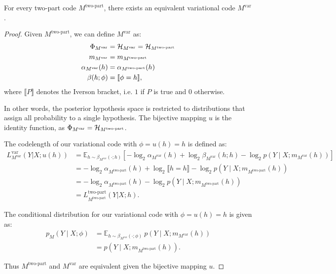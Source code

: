 \begin{lemma}\label{thm:equiv-two-part-var}
For every two-part code $M^{\text{two-part}}$, there exists an equivalent variational code $M^{\text{var}}$.
\end{lemma}
\begin{proof}
Given $M^{\text{two-part}}$, we can define $M^{\text{var}}$ as:
\begin{align}
    \Phi_{M^{\text{var}}} &= {\mathcal{H}}_{M^{\text{var}}} = {\mathcal{H}}_{M^{\text{two-part}}} \\
    m_{M^{\text{var}}} &= m_{M^{\text{two-part}}} \\
    \alpha_{M^{\text{var}}}(h) &= \alpha_{M^{\text{two-part}}}(h) \\
    \beta(h;\phi) &= \llbracket \phi = h \rrbracket,
\end{align}
where $\llbracket P \rrbracket$ denotes the Iverson bracket, i.e. $1$ if $P$ is true and $0$ otherwise.

In other words, the posterior hypothesis space is restricted to distributions that assign all probability to a single hypothesis. The bijective mapping $u$ is the identity function, as $\Phi_{M^{\text{var}}} = {\mathcal{H}}_{M^{\text{two-part}}}$.

The codelength of our variational code with $\phi = u(h) = h$ is defined as:
\begin{align*}
   L^{\text{var}}_{M^{\text{var}}}(Y|X;u(h)) &= \mathbb{E}_{h \sim \beta_{M^{\text{var}}}(\cdot;h)} \left[
-\log_2\alpha_{M^{\text{var}}}(h) + \log_2\beta_{M^{\text{var}}}(h;h) - \log_2p(Y \mid X; m_{M^{\text{var}}}(h))
\right] \\
&= -\log_2\alpha_{M^{\text{two-part}}}(h) + \log_2 \llbracket h = h \rrbracket - \log_2p(Y \mid X; m_{M^{\text{two-part}}}(h))  \\
&= -\log_2\alpha_{M^{\text{two-part}}}(h) -\log_2p(Y \mid X; m_{M^{\text{two-part}}}(h)) \\
&= L^{\text{two-part}}_{M^{\text{two-part}}}(Y|X;h).
\end{align*}

The conditional distribution for our variational code with $\phi = u(h) = h$ is given as:
\begin{align*}
    p_M(Y \mid X; \phi) &= \mathbb{E}_{h \sim  \beta_{M^{\text{var}}}(\cdot;\phi)} ~p(Y \mid X;m_{M^{\text{var}}}(h)) \\
   &= p(Y \mid X;m_{M^{\text{two-part}}}(h)).
\end{align*}

Thus $M^{\text{two-part}}$ and $M^{\text{var}}$ are equivalent given the bijective mapping $u$.
\end{proof}

